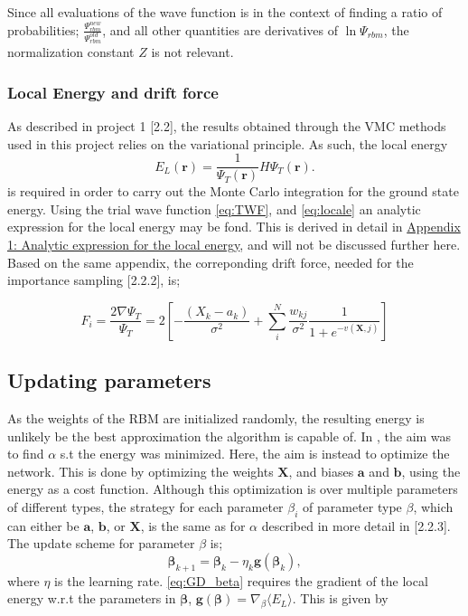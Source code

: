 \documentclass[%
oneside,                 %
final,                   %
10pt]{article}
\begin{document}
Since all evaluations of the wave function is in the context of finding a ratio of probabilities; $\frac{\Psi_{rbm}^{new}}{\Psi_{rbm}^{old}}$, and all other quantities are derivatives of $\ln \Psi_{rbm}$, the normalization constant $Z$ is not relevant.


\subsubsection{Local Energy and drift force}
As described in project 1 \cite{JN_P1}[2.2], the results obtained through the VMC methods used in this project relies on the variational principle. As such, the local energy
\begin{equation}
    E_L(\mathbf{r})=\frac{1}{\Psi_T(\mathbf{r})}H\Psi_T(\mathbf{r}).
    \label{eq:locale}
 \end{equation}
is required in order to carry out the Monte Carlo integration for the ground state energy. Using the trial wave function \eqref{eq:TWF}, and \eqref{eq:locale} an analytic expression for the local energy may be fond. This is derived in detail in \hyperref[APP_1]{Appendix 1: Analytic expression for the local energy}, and will not be discussed further here. Based on the same appendix, the correponding drift force, needed for the importance sampling \cite{JN_P1}[2.2.2], is;

\begin{equation}
F_i = \frac{2\nabla \Psi_T}{\Psi_T} = 2 \left[- \frac{(X_k - a_k)}{\sigma^2} + \sum_{i}^N \frac{w_{kj}}{\sigma^2}\frac{1}{1 + e^{-v(\bm X,j)}} \right]
\end{equation} 

\subsection{Updating parameters}
As the weights of the RBM are initialized randomly, the resulting energy is unlikely be the best approximation the algorithm is capable of. In \cite{JN_P1}, the aim was to find $\alpha$ s.t the energy was minimized. Here, the aim is instead to optimize the network.  This is done by optimizing the weights $\bm X$, and biases $\bm a$ and $\bm b$, using the energy as a cost function. Although this optimization is over multiple parameters of different types, the strategy for each parameter $\beta_i$ of parameter type $\beta$, which can either be $\bm a$, $\bm b$, or $\bm X$, is the same as for $\alpha$ described in more detail in \cite{JN_P1}[2.2.3]. The update scheme for parameter $\beta$ is;
\begin{equation}
\bm{\beta}_{k+1}=\bm{\beta}_{k}-\eta_k  \bm g (\bm{\beta}_k),
\label{eq:GD_beta}
\end{equation}
where $\eta$ is the learning rate. \eqref{eq:GD_beta} requires the gradient of the local energy w.r.t the parameters in $\bm \beta$, $\bm g (\bm \beta)=\nabla_{\beta} \langle E_L \rangle$. This is given by
\end{document}
